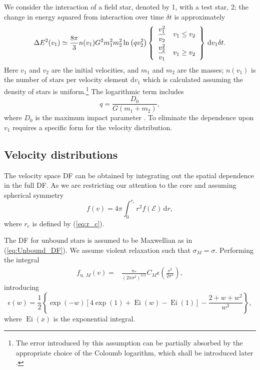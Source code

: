 \documentclass[useAMS,usedcolumn,usegraphicx,usenatbib]{mn2e}
\newcommand{\eqnref}[1]{(\ref{eq:#1})}
\DeclareMathOperator{\Ei}{Ei}
\newcommand{\sub}[1]{\ensuremath{_\mathrm{#1}}}
\newcommand{\dd}{\ensuremath{\mathrm{d}}}
\newcommand{\intd}[4]{\ensuremath{\displaystyle \int_{#1}^{#2}{#3}\,\dd{#4}}}
\newcommand{\recip}[1]{\ensuremath{\dfrac{1}{#1}}}
\begin{document}
\begin{onecolumn}
We consider the interaction of a field star, denoted by 1, with a test star, 2; the change in energy squared from interaction over time $\delta t$ is approximately \citep[chapter 2]{Chandrasekhar1960}
\begin{equation}
\Delta E^2(v_1) \simeq \frac{8\pi}{3} n(v_1)G^2m_1^2 m_2^2\ln\left(qv_2^2\right)\left\{\begin{array}{lr}\dfrac{v_1^2}{v_2}\vspace{1.0mm} & v_1 \leq v_2\\ \dfrac{v_2^2}{v_1} & v_1 \geq v_2 \end{array}\right\}\,\dd v_1\delta t.
\end{equation}
Here $v_1$ and $v_2$ are the initial velocities, and $m_1$ and $m_2$ are the masses; $n(v_1)$ is the number of stars per velocity element $\dd v_1$ which is calculated assuming the density of stars is uniform.\footnote{The error introduced by this assumption can be partially absorbed by the appropriate choice of the Coloumb logarithm, which shall be introduced later \citep{Just2011}.} The logarithmic term includes
\begin{equation}
q = \frac{D_0}{G\left(m_1+m_2\right)},
\end{equation}
where $D_0$ is the maximum impact parameter \citep{Weinberg1986}. To eliminate the dependence upon $v_1$ requires a specific form for the velocity distribution.

\subsection{Velocity distributions}

The velocity space DF can be obtained by integrating out the spatial dependence in the full DF. As we are restricting our attention to the core and assuming spherical symmetry
\begin{equation}
f(v) = 4\pi\intd{0}{r\sub{c}}{r^2f(\mathcal{E})}{r},
\end{equation}
where $r\sub{c}$ is defined by \eqnref{r_c}.

The DF for unbound stars is assumed to be Maxwellian as in \eqnref{Unbound_DF}. We assume violent relaxation such that $\sigma_M = \sigma$. Performing the integral
\begin{align}
f_{\mathrm{u},\,M}(v) = {} & \frac{n_\ast}{\left(2\pi\sigma^2\right)^{3/2}}C_M\epsilon\left(\frac{v^2}{2\sigma^2}\right),
\end{align}
introducing
\begin{equation}
\epsilon(w) = \recip{2}\left\{\exp(-w)\left[4\exp(1) + \Ei(w) - \Ei(1)\right] - \frac{2 + w + w^2}{w^3}\right\},
\end{equation}
where $\Ei(x)$ is the exponential integral.


\end{onecolumn}
\end{document}

